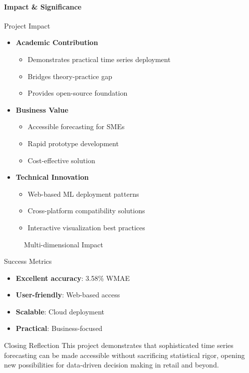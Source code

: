{ 
	\framesubtitle{Impact \& Significance}
	
	\begin{block}{Project Impact}
		\begin{itemize}
			\item \textbf{Academic Contribution}
			\begin{itemize}
				\item Demonstrates practical time series deployment
				\item Bridges theory-practice gap
				\item Provides open-source foundation
			\end{itemize}
			
			\item \textbf{Business Value}
			\begin{itemize}
				\item Accessible forecasting for SMEs
				\item Rapid prototype development
				\item Cost-effective solution
			\end{itemize}
			
			\item \textbf{Technical Innovation}
			\begin{itemize}
				\item Web-based ML deployment patterns
				\item Cross-platform compatibility solutions
				\item Interactive visualization best practices
			\end{itemize}
		\end{itemize}
	\end{block}
	
	\begin{figure}[H]
		\centering
		
		\caption{Multi-dimensional Impact}
	\end{figure}
	
	\begin{alertblock}{Success Metrics}
		\begin{itemize}
			\item \checkmark \textbf{Excellent accuracy}: 3.58\% WMAE
			\item \checkmark \textbf{User-friendly}: Web-based access
			\item \checkmark \textbf{Scalable}: Cloud deployment
			\item \checkmark \textbf{Practical}: Business-focused
		\end{itemize}
	\end{alertblock}
	
	\begin{exampleblock}{Closing Reflection}
		This project demonstrates that sophisticated time series forecasting can be made accessible 
		without sacrificing statistical rigor, opening new possibilities for data-driven 
		decision making in retail and beyond.
	\end{exampleblock}
}
